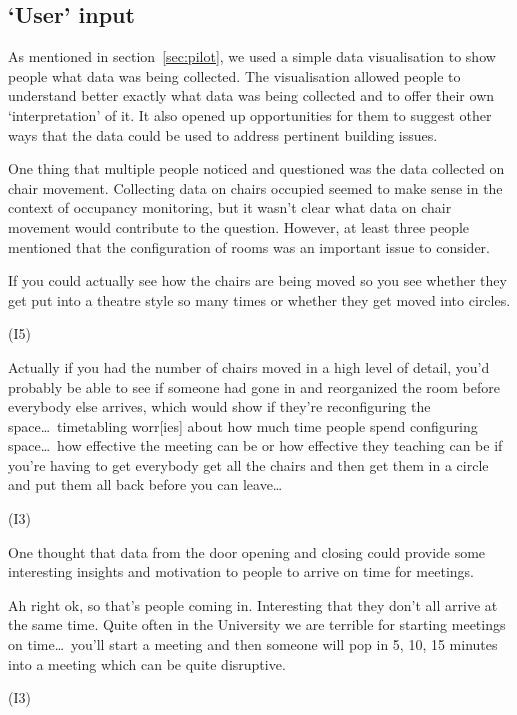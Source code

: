 \subsection{`User' input}
\label{sec:user-input}

As mentioned in section~\ref{sec:pilot}, we used a simple data
visualisation to show people what data was being collected. The
visualisation allowed people to understand better exactly what data
was being collected and to offer their own ‘interpretation’ of it. It
also opened up opportunities for them to suggest other ways that the
data could be used to address pertinent building issues.

One thing that multiple people noticed and questioned was the data
collected on chair movement. Collecting data on chairs occupied seemed
to make sense in the context of occupancy monitoring, but it wasn’t
clear what data on chair movement would contribute to the
question. However, at least three people mentioned that the
configuration of rooms was an important issue to consider.

\begin{qt}If you could actually see how the chairs are being moved so you see
whether they get put into a theatre style so many times or whether
they get moved into circles.\end{qt} (I5)

\begin{qt}Actually if you had the number of chairs moved in a high level of
detail, you’d probably be able to see if someone had gone in and
reorganized the room before everybody else arrives, which would show
if they’re reconfiguring the space\ldots\  timetabling worr[ies] about how
much time people spend configuring space\ldots\ {}how effective the meeting can
be or how effective they teaching can be if you’re having to get
everybody get all the chairs and then get them in a circle and put
them all back before you can leave\ldots\ {}\end{qt} (I3)

One thought that data from the door opening and closing could provide
some interesting insights and motivation to people to arrive on time
for meetings.

\begin{qt}Ah right ok, so that’s people coming in. Interesting that they don’t
all arrive at the same time. Quite often in the University we are
terrible for starting meetings on time\ldots\  you’ll start a meeting and then someone will pop in
5, 10, 15 minutes into a meeting which can be quite disruptive.\end{qt} (I3)

